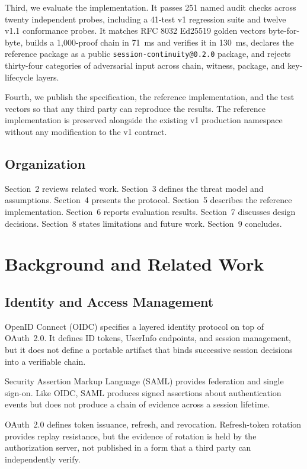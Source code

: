 \documentclass[11pt,a4paper]{article}
\begin{document}
Third, we evaluate the implementation. It passes 251 named audit checks across twenty independent probes, including a 41-test v1 regression suite and twelve v1.1 conformance probes. It matches RFC 8032 Ed25519 golden vectors byte-for-byte, builds a 1{,}000-proof chain in 71~ms and verifies it in 130~ms, declares the reference package as a public \texttt{session-continuity@0.2.0} package, and rejects thirty-four categories of adversarial input across chain, witness, package, and key-lifecycle layers.

Fourth, we publish the specification, the reference implementation, and the test vectors so that any third party can reproduce the results. The reference implementation is preserved alongside the existing v1 production namespace without any modification to the v1 contract.

\subsection{Organization}

Section~2 reviews related work. Section~3 defines the threat model and assumptions. Section~4 presents the protocol. Section~5 describes the reference implementation. Section~6 reports evaluation results. Section~7 discusses design decisions. Section~8 states limitations and future work. Section~9 concludes.

\section{Background and Related Work}

\subsection{Identity and Access Management}

OpenID Connect (OIDC) specifies a layered identity protocol on top of OAuth~2.0. It defines ID tokens, UserInfo endpoints, and session management, but it does not define a portable artifact that binds successive session decisions into a verifiable chain.

Security Assertion Markup Language (SAML) provides federation and single sign-on. Like OIDC, SAML produces signed assertions about authentication events but does not produce a chain of evidence across a session lifetime.

OAuth~2.0 defines token issuance, refresh, and revocation. Refresh-token rotation provides replay resistance, but the evidence of rotation is held by the authorization server, not published in a form that a third party can independently verify.
\end{document}
